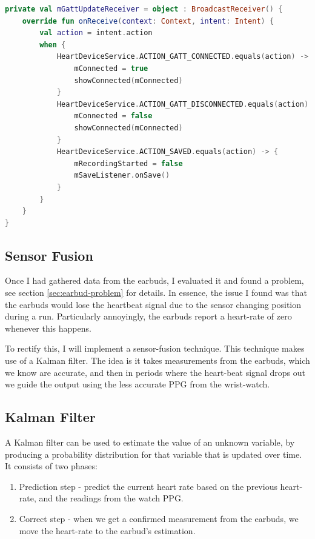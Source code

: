 \documentclass[12pt,a4paper,twoside,openany]{report}
\begin{document}
\begin{lstlisting}[language=Kotlin]
private val mGattUpdateReceiver = object : BroadcastReceiver() {
    override fun onReceive(context: Context, intent: Intent) {
        val action = intent.action
        when {
            HeartDeviceService.ACTION_GATT_CONNECTED.equals(action) -> {
                mConnected = true
                showConnected(mConnected)
            }
            HeartDeviceService.ACTION_GATT_DISCONNECTED.equals(action) -> {
                mConnected = false
                showConnected(mConnected)
            }
            HeartDeviceService.ACTION_SAVED.equals(action) -> {
                mRecordingStarted = false
                mSaveListener.onSave()
            }
        }
    }
}
\end{lstlisting}


\subsection{Sensor Fusion}

Once I had gathered data from the earbuds, I evaluated it and found a problem,
see section \ref{sec:earbud-problem} for details. In essence, the issue I
found was that the earbuds would lose the heartbeat signal due to the sensor
changing position during a run. Particularly annoyingly, the earbuds report a
heart-rate of zero whenever this happens. 

To rectify this, I will implement a sensor-fusion technique. This technique
makes use of a Kalman filter. The idea is it takes measurements from the earbuds, which
we know are accurate, and then in periods where the heart-beat signal drops
out we guide the output using the less accurate PPG from the wrist-watch.

\subsection{Kalman Filter}

A Kalman filter can be used to estimate the value of an unknown variable, by
producing a probability distribution for that variable that is updated over
time.
It consists of two phases:
\begin{enumerate}
	\item Prediction step - predict the current heart rate based on the
		previous heart-rate, and the readings from the watch PPG.

	\item Correct step - when we get a confirmed measurement from the
		earbuds, we move the heart-rate to the earbud's estimation.
\end{enumerate}
\end{document}
